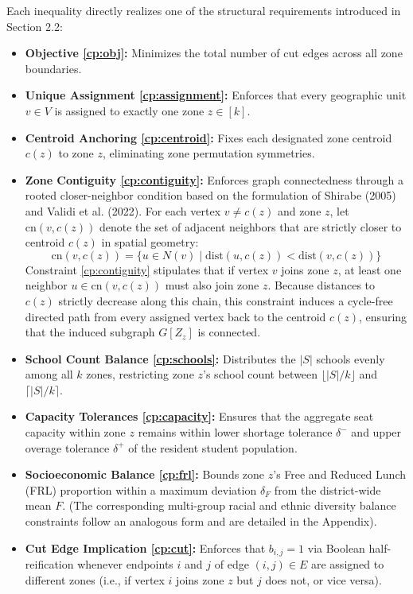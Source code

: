 \documentclass{article}
\begin{document}
Each inequality directly realizes one of the structural requirements introduced in Section 2.2:
\begin{itemize}
    \item \textbf{Objective \eqref{cp:obj}:} Minimizes the total number of cut edges across all zone boundaries.
    \item \textbf{Unique Assignment \eqref{cp:assignment}:} Enforces that every geographic unit $v \in V$ is assigned to exactly one zone $z \in [k]$.
    \item \textbf{Centroid Anchoring \eqref{cp:centroid}:} Fixes each designated zone centroid $c(z)$ to zone $z$, eliminating zone permutation symmetries.
    \item \textbf{Zone Contiguity \eqref{cp:contiguity}:} Enforces graph connectedness through a rooted closer-neighbor condition based on the formulation of Shirabe (2005) and Validi et al. (2022). For each vertex $v \neq c(z)$ and zone $z$, let $\text{cn}(v, c(z))$ denote the set of adjacent neighbors that are strictly closer to centroid $c(z)$ in spatial geometry:
    $$\text{cn}(v, c(z)) = \{u \in N(v) \mid \text{dist}(u, c(z)) < \text{dist}(v, c(z))\}$$
    Constraint \eqref{cp:contiguity} stipulates that if vertex $v$ joins zone $z$, at least one neighbor $u \in \text{cn}(v, c(z))$ must also join zone $z$. Because distances to $c(z)$ strictly decrease along this chain, this constraint induces a cycle-free directed path from every assigned vertex back to the centroid $c(z)$, ensuring that the induced subgraph $G[Z_z]$ is connected.
    \item \textbf{School Count Balance \eqref{cp:schools}:} Distributes the $|S|$ schools evenly among all $k$ zones, restricting zone $z$'s school count between $\lfloor |S|/k \rfloor$ and $\lceil |S|/k \rceil$.
    \item \textbf{Capacity Tolerances \eqref{cp:capacity}:} Ensures that the aggregate seat capacity within zone $z$ remains within lower shortage tolerance $\delta^-$ and upper overage tolerance $\delta^+$ of the resident student population.
    \item \textbf{Socioeconomic Balance \eqref{cp:frl}:} Bounds zone $z$'s Free and Reduced Lunch (FRL) proportion within a maximum deviation $\delta_F$ from the district-wide mean $F$. (The corresponding multi-group racial and ethnic diversity balance constraints follow an analogous form and are detailed in the Appendix).
    \item \textbf{Cut Edge Implication \eqref{cp:cut}:} Enforces that $b_{i,j} = 1$ via Boolean half-reification whenever endpoints $i$ and $j$ of edge $(i,j) \in E$ are assigned to different zones (i.e., if vertex $i$ joins zone $z$ but $j$ does not, or vice versa).
\end{itemize}
\end{document}
